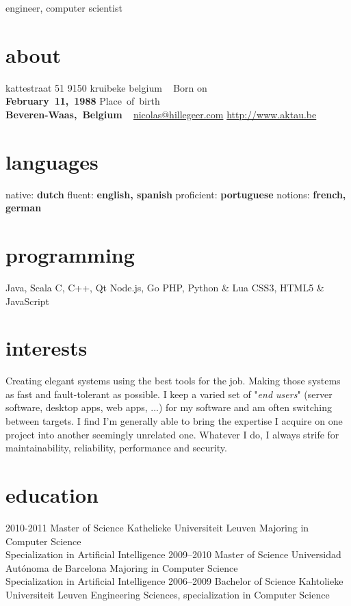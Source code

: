 \documentclass[]{friggeri-cv}
\begin{document}
       {engineer, computer scientist}


\begin{aside}
  \section{about}
    kattestraat 51
    9150 kruibeke
    belgium
    ~
    Born on\\\textbf{February~11,~1988}
    Place~of~birth\\\textbf{Beveren-Waas,~Belgium}
    ~
    \href{mailto:nicolas@hillegeer.com}{nicolas@hillegeer.com}
    \href{http://www.aktau.be}{http://www.aktau.be}
  \section{languages}
    native: \textbf{dutch}
    fluent: \textbf{english, spanish}
    proficient: \textbf{portuguese}
    notions: \textbf{french, german}
  \section{programming}
    Java, Scala
    C, C++, Qt
    Node.js, Go
    PHP, Python \& Lua
    CSS3, HTML5 \& JavaScript
\end{aside}

\section{interests}

Creating elegant systems using the best tools for the job. Making those systems as fast and fault-tolerant as possible.
I keep a varied set of "\emph{end users}" (server software, desktop apps, web apps, ...) for my software and am often switching
between targets. I find I'm generally able to bring the expertise I acquire on one project into another seemingly unrelated one.
Whatever I do, I always strife for maintainability, reliability, performance and security.

\section{education}

\begin{entrylist}
  \entry
    {2010-2011}
    {Master of Science}
    {Kathelieke Universiteit Leuven}
    {Majoring in Computer Science\\
    Specialization in Artificial Intelligence}
  \entry
    {2009–2010}
    {Master of Science}
    {Universidad Autónoma de Barcelona}
    {Majoring in Computer Science\\
    Specialization in Artificial Intelligence}
  \entry
    {2006–2009}
    {Bachelor of Science}
    {Kahtolieke Universiteit Leuven}
    {Engineering Sciences, specialization in Computer Science}
\end{entrylist}
\end{document}
